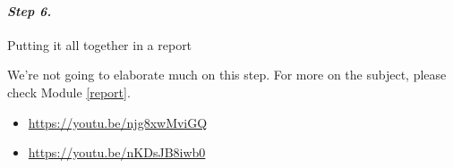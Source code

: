 



\paragraph{\emph{Step 6.}} Putting it all together in a report

We're not going to elaborate much on this step. For more on the subject, please check Module \ref{report}.





\begin{video}
\begin{itemize}
	\item \href{https://youtu.be/njg8xwMviGQ}{https://youtu.be/njg8xwMviGQ} \hfill {}
	\item \href{https://youtu.be/nKDsJB8iwb0}{https://youtu.be/nKDsJB8iwb0} \hfill {}
\end{itemize}	
\end{video}

